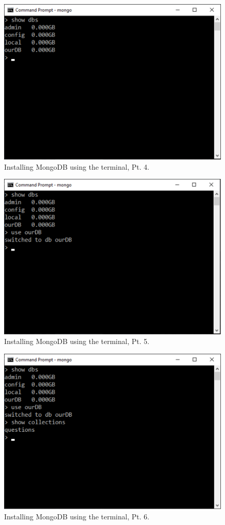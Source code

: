 \documentclass[titlepage, 12pt]{article}
\begin{document}
\begin{figure}[p]
    \centering\includegraphics[width=0.75\linewidth]{images/mongodb-terminal-4.png}
    \caption{Installing MongoDB using the terminal, Pt. 4.}
\end{figure}

\begin{figure}[p]
    \centering\includegraphics[width=0.75\linewidth]{images/mongodb-terminal-5.png}
    \caption{Installing MongoDB using the terminal, Pt. 5.}
\end{figure}

\begin{figure}[p]
    \centering\includegraphics[width=0.75\linewidth]{images/mongodb-terminal-6.png}
    \caption{Installing MongoDB using the terminal, Pt. 6.}
\end{figure}
\end{document}
